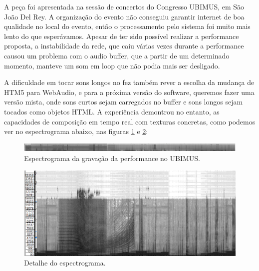 A peça foi apresentada na sessão de concertos do Congresso UBIMUS, em São João Del Rey. A organização do evento não conseguiu garantir internet de boa qualidade no local do evento, então o processamento pelo sistema foi muito mais lento do que esperávamos. Apesar de ter sido possível realizar a performance proposta, a instabilidade da rede, que caiu várias vezes durante a performance causou um problema com o audio buffer, que a partir de um determinado momento, manteve um som em loop que não podia mais ser desligado.

A dificuldade em tocar sons longos no fez também rever a escolha da mudança de HTM5 para WebAudio, e para a próxima versão do software, queremos fazer uma versão mista, onde sons curtos sejam carregados no buffer e sons longos sejam tocados como objetos HTML. A experiência demontrou no entanto, as capacidades de composição em tempo real com texturas concretas, como podemos ver no espectrograma abaixo, nas figuras \ref{specubimus} e \ref{spceubimusdt}:

\begin{figure}

\includegraphics[width=1\linewidth]{pictures/cap4/canibalspec2}
\caption{Espectrograma da gravação da performance no UBIMUS.}
\label{specubimus}
\end{figure}

\begin{figure}

\includegraphics[width=1\linewidth]{pictures/cap4/canibalspecdbvdt}
\caption{Detalhe do espectrograma.}
\label{spceubimusdt}
\end{figure}

